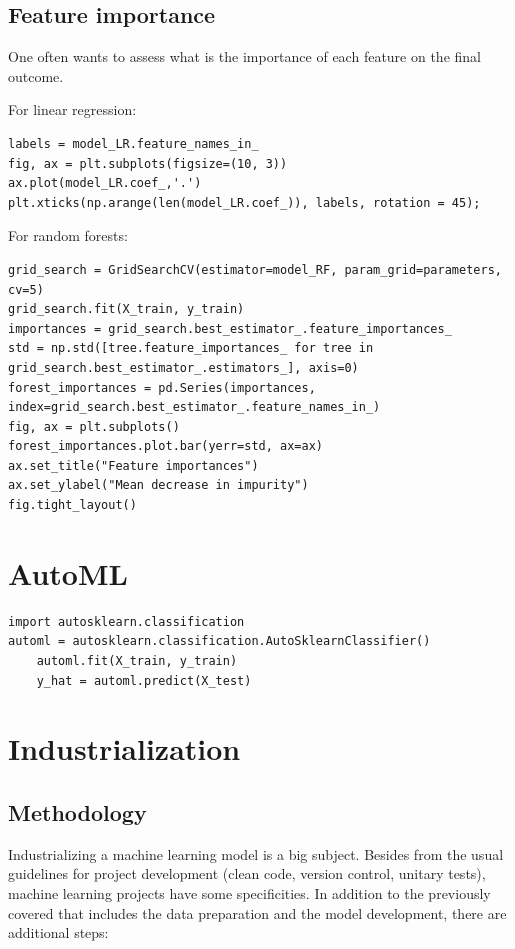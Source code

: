 \documentclass[24pt]{article}
\begin{document}
\subsection{Feature importance}
One often wants to assess what is the importance of each feature on the final outcome. 


For linear regression:
\begin{lstlisting}
labels = model_LR.feature_names_in_
fig, ax = plt.subplots(figsize=(10, 3))
ax.plot(model_LR.coef_,'.')
plt.xticks(np.arange(len(model_LR.coef_)), labels, rotation = 45);
\end{lstlisting}


For random forests:
\begin{lstlisting}
grid_search = GridSearchCV(estimator=model_RF, param_grid=parameters, cv=5)
grid_search.fit(X_train, y_train)
importances = grid_search.best_estimator_.feature_importances_
std = np.std([tree.feature_importances_ for tree in grid_search.best_estimator_.estimators_], axis=0)
forest_importances = pd.Series(importances, index=grid_search.best_estimator_.feature_names_in_)
fig, ax = plt.subplots()
forest_importances.plot.bar(yerr=std, ax=ax)
ax.set_title("Feature importances")
ax.set_ylabel("Mean decrease in impurity")
fig.tight_layout()
\end{lstlisting}


\section{AutoML}

\begin{lstlisting}
import autosklearn.classification
automl = autosklearn.classification.AutoSklearnClassifier()
    automl.fit(X_train, y_train)
    y_hat = automl.predict(X_test)
\end{lstlisting}


\section{Industrialization}

\subsection{Methodology}
Industrializing a machine learning model is a big subject.
Besides from the usual guidelines for project development (clean code, version control, unitary tests), machine learning projects have some specificities.
 In addition to the previously covered that includes the data preparation  and the model development, there are additional steps: 
 
\end{document}

